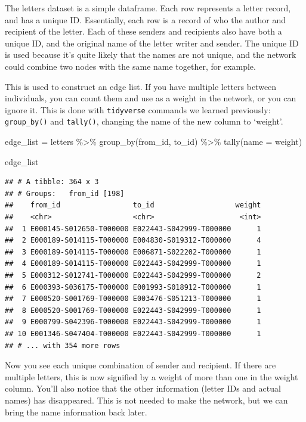 \documentclass[
]{book}
\newenvironment{Shaded}{\begin{snugshade}}{\end{snugshade}}
\newcommand{\AttributeTok}[1]{\textcolor[rgb]{0.77,0.63,0.00}{#1}}
\newcommand{\FunctionTok}[1]{\textcolor[rgb]{0.00,0.00,0.00}{#1}}
\newcommand{\NormalTok}[1]{#1}
\newcommand{\OtherTok}[1]{\textcolor[rgb]{0.56,0.35,0.01}{#1}}
\newcommand{\SpecialCharTok}[1]{\textcolor[rgb]{0.00,0.00,0.00}{#1}}
\newcommand{\StringTok}[1]{\textcolor[rgb]{0.31,0.60,0.02}{#1}}
\begin{document}
The letters dataset is a simple dataframe. Each row represents a letter record, and has a unique ID. Essentially, each row is a record of who the author and recipient of the letter. Each of these senders and recipients also have both a unique ID, and the original name of the letter writer and sender. The unique ID is used because it's quite likely that the names are not unique, and the network could combine two nodes with the same name together, for example.

This is used to construct an edge list. If you have multiple letters between individuals, you can count them and use as a weight in the network, or you can ignore it. This is done with \texttt{tidyverse} commands we learned previously: \texttt{group\_by()} and \texttt{tally()}, changing the name of the new column to `weight'.

\begin{Shaded}
\begin{Highlighting}[]
\NormalTok{edge\_list }\OtherTok{=}\NormalTok{ letters }\SpecialCharTok{\%\textgreater{}\%} 
  \FunctionTok{group\_by}\NormalTok{(from\_id, to\_id) }\SpecialCharTok{\%\textgreater{}\%} 
  \FunctionTok{tally}\NormalTok{(}\AttributeTok{name =} \StringTok{\textquotesingle{}weight\textquotesingle{}}\NormalTok{)}

\NormalTok{edge\_list}
\end{Highlighting}
\end{Shaded}

\begin{verbatim}
## # A tibble: 364 x 3
## # Groups:   from_id [198]
##    from_id                 to_id                   weight
##    <chr>                   <chr>                    <int>
##  1 E000145-S012650-T000000 E022443-S042999-T000000      1
##  2 E000189-S014115-T000000 E004830-S019312-T000000      4
##  3 E000189-S014115-T000000 E006871-S022202-T000000      1
##  4 E000189-S014115-T000000 E022443-S042999-T000000      1
##  5 E000312-S012741-T000000 E022443-S042999-T000000      2
##  6 E000393-S036175-T000000 E001993-S018912-T000000      1
##  7 E000520-S001769-T000000 E003476-S051213-T000000      1
##  8 E000520-S001769-T000000 E022443-S042999-T000000      1
##  9 E000799-S042396-T000000 E022443-S042999-T000000      1
## 10 E001346-S047404-T000000 E022443-S042999-T000000      1
## # ... with 354 more rows
\end{verbatim}

Now you see each unique combination of sender and recipient. If there are multiple letters, this is now signified by a weight of more than one in the weight column. You'll also notice that the other information (letter IDs and actual names) has disappeared. This is not needed to make the network, but we can bring the name information back later.
\end{document}
